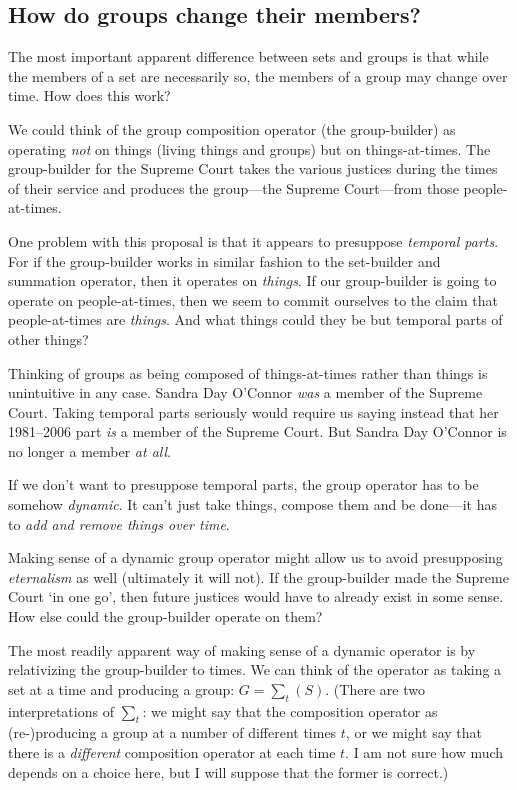 \documentclass[11pt]{article}
\begin{document}
\begin{spacing}{1.5}

\subsection{How do groups change their members?}
\label{group-time}
The most important apparent difference between sets and groups is that
while the members of a set are necessarily so, the members of a group
may change over time.  How does this work?

We could think of the group composition operator (the group-builder)
as operating {\em not} on things (living things and groups) but on
things-at-times.  The group-builder for the Supreme Court takes the
various justices during the times of their service and produces the
group---the Supreme Court---from those people-at-times.

One problem with this proposal is that it appears to presuppose {\em
  temporal parts}.  For if the group-builder works in similar fashion
to the set-builder and summation operator, then it operates on {\em
  things}.  If our group-builder is going to operate on
people-at-times, then we seem to commit ourselves to the claim that
people-at-times are {\em things}.  And what things could they be but
temporal parts of other things?

Thinking of groups as being composed of things-at-times rather than
things is unintuitive in any case.  Sandra Day O'Connor \emph{was} a
member of the Supreme Court.  Taking temporal parts seriously would
require us saying instead that her 1981--2006 part \emph{is} a member
of the Supreme Court.  But Sandra Day O'Connor is no longer a member
{\em at all}.

If we don't want to presuppose temporal parts, the group operator has
to be somehow \emph{dynamic}. It can't just take things, compose them
and be done---it has to \emph{add and remove things over time}.

Making sense of a dynamic group operator might allow us to avoid
presupposing {\em eternalism} as well (ultimately it will not).  If
the group-builder made the Supreme Court `in one go', then future
justices would have to already exist in some sense.  How else could
the group-builder operate on them?

The most readily apparent way of making sense of a dynamic operator is
by relativizing the group-builder to times.  We can think of the
operator as taking a set at a time and producing a group: $G = \sum
_{t} (S)$.  (There are two interpretations of $\sum _{t}$: we might
say that the composition operator as (re-)producing a group at a
number of different times $t$, or we might say that there is a {\em
  different} composition operator at each time $t$.  I am not sure how
much depends on a choice here, but I will suppose that the former is
correct.)


\end{spacing}
\end{document}
